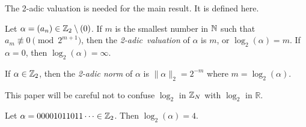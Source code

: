 \par The 2-adic valuation is needed for the main result. It is defined here.

\begin{definition}\label{2-adic-val}
  Let $\alpha=(a_n)\in\mathbb{Z}_2\setminus(0)$. If $m$ is the smallest number in
  $\mathbb{N}$ such that $a_m \not\equiv 0 \pmod{2^{m+1}}$, then the {\em 2-adic\ 
  valuation} of $\alpha$ is $m$, or $\log_2(\alpha)=m$. If $\alpha=0$, then
  $\log_2(\alpha)=\infty$.
\end{definition}

\begin{definition}\label{2-adic-norm}
	If $\alpha \in \mathbb{Z}_2$, then the {\em 2-adic norm} of $\alpha$ is
  $\lVert \alpha \rVert_2 = 2^{-m}$ where $m=\log_2(\alpha)$. 
\end{definition}

\par This paper will be careful not to confuse $\log_2$ in $\mathbb{Z}_N$ with 
$\log_2$ in $\mathbb{R}$.

\begin{example}
  Let $\alpha=00001011011\cdots\in\mathbb{Z}_2$. Then $\log_2(\alpha)=4$.
\end{example}

